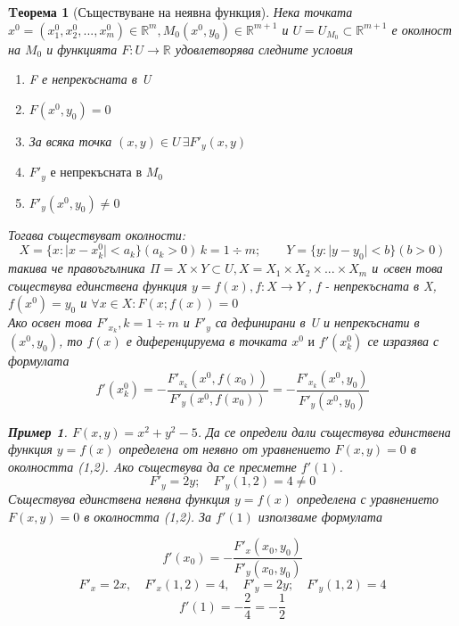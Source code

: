 \documentclass[fleqn,12pt]{article}
\newtheorem{theorem}{Tеорема}[subsection]
\newtheorem{example}{Пример}[subsection]
\begin{document}
\begin{theorem}[Съществуване на неявна функция]
Нека точката $x^0 = (x_1 ^0, x_2 ^0, ..., x_m ^0) \in \mathbb{R}^m, M_0 (x^0, y_0) \in \mathbb{R}^{m+1}$ и $U = U_{M_0} \subset \mathbb{R}^{m+1}$ е околност на $M_0$ и функцията $F: U \to \mathbb{R}$ удовлетворява следните условия
\begin{enumerate}

\item F е непрекъсната в U

\item $F(x^0, y_0) = 0$

\item За всяка точка $(x, y) \in U \, \exists F'_y(x,y)$

\item $F'_y \text{ е непрекъсната в } M_0$

\item $F'_y (x^0, y_0) \neq 0$
\end{enumerate}
Тогава съществуват околности:
$$X = \{x: \vert x - x_k ^0 \vert < a_k\} (a_k>0)\, k =1 \div m; \qquad Y = \{y: \vert y - y_0 \vert < b\} (b>0)$$
такива че правоъгълника $\Pi = X \times Y \subset U, X = X_1 \times X_2 \times ... \times X_m$ и oсвен това съществува единствена функция $y = f(x), f: X \to Y$ , f - непрекъсната в X, $f(x^0) = y_0$ и $\forall x \in X: F(x;f(x)) = 0 $ \\
Ако освен това $F'_{x_k}, k =1 \div m $ и $F'_y$ са дефинирани в U и непрекъснати в $(x^0, y_0)$, то $f(x)$ е диференцируема в точката $x^0 \text{ и } f'(x_k ^0)$ се изразява с формулата 
$$f'(x_k ^0) = - \dfrac{F'_{x_k}(x^0,f(x_0))}{F'_y(x^0,f(x_0))} = - \dfrac{F'_{x_k}(x^0,y_0)}{F'_y(x^0,y_0)} $$

\begin{example}
$F(x,y) = x^2 + y^2 - 5$. Да се определи дали съществува единствена функция $y = f(x)$ определена от неявно от уравнението $F(x,y) = 0$ в околността (1,2). Aко съществува да се пресметне $f'(1)$. \\
$$F'_y = 2y; \quad F'_y(1,2) = 4 \neq 0$$
Съществува единствена неявна функция $y = f(x)$ определена с уравнението $F(x,y) = 0$ в околността (1,2).
За $f'(1)$ използваме формулата

$$f'(x_0) = - \dfrac{F'_x(x_0,y_0)}{F'_y(x_0,y_0)} $$
$$F'_x = 2x, \quad F'_x(1,2) = 4 , \quad F'_y = 2y; \quad F'_y(1,2) = 4$$
$$f'(1) = - \dfrac{2}{4} = - \dfrac{1}{2}$$
\end{example}


\end{theorem}
\end{document}
